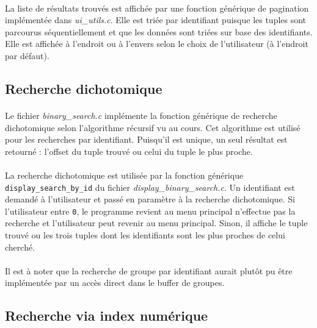\documentclass{article}
\begin{document}
    \paragraph{}
    La liste de résultats trouvés est affichée par une fonction générique de pagination implémentée dans \emph{ui\_utils.c}. Elle est triée par identifiant puisque les tuples sont parcourus séquentiellement et que les données sont triées sur base des identifiants. Elle est affichée à l'endroit ou à l'envers selon le choix de l'utilisateur (à l'endroit par défaut).


    \subsection{Recherche dichotomique}
    \paragraph{}
    Le fichier \emph{binary\_search.c} implémente la fonction générique de recherche dichotomique selon l'algorithme récursif vu au cours. Cet algorithme est utilisé pour les recherches par identifiant. Puisqu'il est unique, un seul résultat est retourné : l'offset du tuple trouvé ou celui du tuple le plus proche.

    \paragraph{}
    La recherche dichotomique est utilisée par la fonction générique \texttt{display\_search\_by\_id} du fichier \emph{display\_binary\_search.c}. Un identifiant est demandé à l'utilisateur et passé en paramètre à la recherche dichotomique. Si l'utilisateur entre \texttt{0}, le programme revient au menu principal n'effectue pas la recherche et l'utilisateur peut revenir au menu principal. Sinon, il affiche le tuple trouvé ou les trois tuples dont les identifiants sont les plus proches de celui cherché.

    \paragraph{}
    Il est à noter que la recherche de groupe par identifiant aurait plutôt pu être implémentée par un accès direct dans le buffer de groupes.


    \subsection{Recherche via index numérique}
\end{document}

